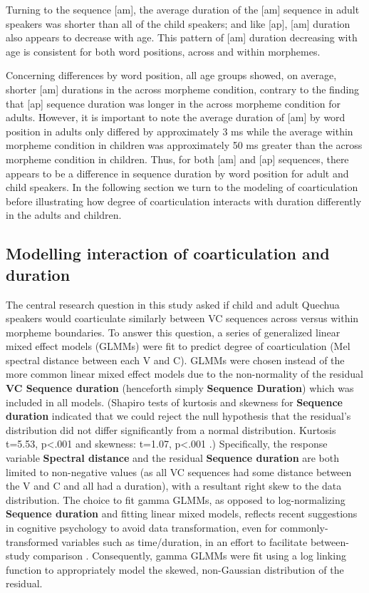 \documentclass[a4paper,man,floatsintext,natbib,donotrepeattitle, apacite]{apa6}
\begin{document}
Turning to the sequence {[}am{]}, the average duration of the {[}am{]} sequence in adult speakers was shorter than all of the child speakers; and like {[}ap{]}, {[}am{]} duration also appears to decrease with age. This pattern of {[}am{]} duration decreasing with age is consistent for both word positions, across and within morphemes.

Concerning differences by word position, all age groups showed, on average, shorter {[}am{]} durations in the across morpheme condition, contrary to the finding that {[}ap{]} sequence duration was longer in the across morpheme condition for adults. However, it is important to note the average duration of {[}am{]} by word position in adults only differed by approximately 3 ms while the average within morpheme condition in children was approximately 50 ms greater than the across morpheme condition in children. Thus, for both {[}am{]} and {[}ap{]} sequences, there appears to be a difference in sequence duration by word position for adult and child speakers. In the following section we turn to the modeling of coarticulation before illustrating how degree of coarticulation interacts with duration differently in the adults and children.

{%
\subsection{Modelling interaction of coarticulation and duration}\label{modelling-interaction-of-coarticulation-and-duration}}

The central research question in this study asked if child and adult Quechua speakers would coarticulate similarly between VC sequences across versus within morpheme boundaries. To answer this question, a series of generalized linear mixed effect models (GLMMs) were fit to predict degree of coarticulation (Mel spectral distance between each V and C). GLMMs were chosen instead of the more common linear mixed effect models due to the non-normality of the residual \textbf{VC Sequence duration} (henceforth simply \textbf{Sequence Duration}) which was included in all models. (Shapiro tests of kurtosis and skewness for \textbf{Sequence duration} indicated that we could reject the null hypothesis that the residual's distribution did not differ significantly from a normal distribution. Kurtosis t=5.53, p\textless.001 and skewness: t=1.07, p\textless.001 \citep{shapiroComparativeStudyVarious1968}.) Specifically, the response variable \textbf{Spectral distance} and the residual \textbf{Sequence duration} are both limited to non-negative values (as all VC sequences had some distance between the V and C and all had a duration), with a resultant right skew to the data distribution. The choice to fit gamma GLMMs, as opposed to log-normalizing \textbf{Sequence duration} and fitting linear mixed models, reflects recent suggestions in cognitive psychology to avoid data transformation, even for commonly-transformed variables such as time/duration, in an effort to facilitate between-study comparison \citep{loTransformNotTransform2015}. Consequently, gamma GLMMs were fit using a log linking function to appropriately model the skewed, non-Gaussian distribution of the residual.
\end{document}
